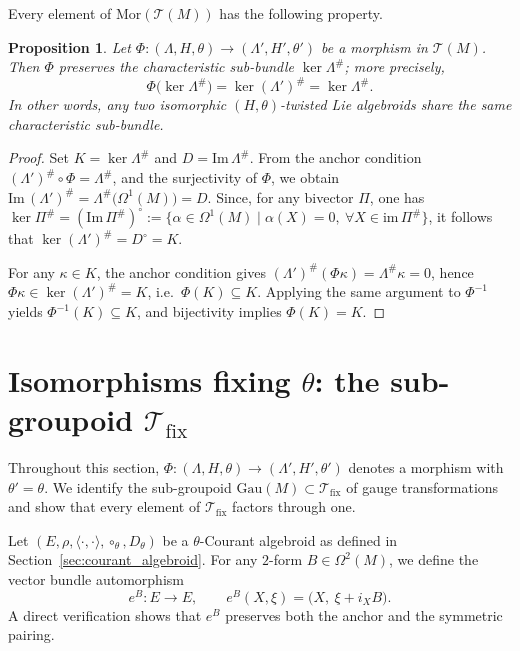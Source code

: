 \documentclass[11pt,a4paper]{article}
\theoremstyle{plain}
\newtheorem{proposition}[theorem]{Proposition}
\theoremstyle{definition}
\theoremstyle{remark}
\begin{document}
Every element of $\mathrm{Mor}(\mathcal{T}(M))$ has the following property.
\begin{proposition}\label{preservation_ancre}
	Let $\Phi : (\Lambda,H,\theta) \to (\Lambda',H',\theta')$ be a morphism
	in $\mathcal{T}(M)$. Then $\Phi$ preserves the characteristic sub-bundle
	$\ker\Lambda^\#$; more precisely,
	$$
	\Phi\bigl(\ker\Lambda^\#\bigr) = \ker(\Lambda')^\# = \ker\Lambda^\#.
	$$
	In other words, any two isomorphic $(H,\theta)$-twisted Lie algebroids
	share the same characteristic sub-bundle.
\end{proposition}

\begin{proof}
	Set $K = \ker\Lambda^\#$ and $D = \mathrm{Im}\,\Lambda^\#$.
	From the anchor condition $(\Lambda')^\#\circ\Phi = \Lambda^\#$, and the
	surjectivity of $\Phi$, we obtain
	$\mathrm{Im}\,(\Lambda')^\# = \Lambda^\#\bigl(\Omega^1(M)\bigr) = D$.
	Since, for any bivector $\Pi$, one has
	$\ker\Pi^\# = (\mathrm{Im}\,\Pi^\#)^\circ
	:= \{\alpha\in\Omega^1(M)\mid \alpha(X)=0,\ \forall X\in \mathrm{im}\,\Pi^\#\}$,
	it follows that
	$\ker(\Lambda')^\# = D^\circ = K$.
	
	For any $\kappa \in K$, the anchor condition gives
	$(\Lambda')^\#(\Phi\kappa) = \Lambda^\#\kappa = 0$, hence
	$\Phi\kappa \in \ker(\Lambda')^\# = K$, i.e.\ $\Phi(K)\subseteq K$.
	Applying the same argument to $\Phi^{-1}$ yields $\Phi^{-1}(K)\subseteq K$,
	and bijectivity implies $\Phi(K)=K$.
\end{proof}

\section{Isomorphisms fixing $\theta$: the sub-groupoid $\mathcal{T}_{\mathrm{fix}}$}
\label{sec:tfix}
 Throughout this section, $\Phi : (\Lambda,H,\theta) \to (\Lambda',H',\theta')$ denotes a morphism with $\theta'=\theta$. We identify the sub-groupoid $\mathrm{Gau}(M)\subset\mathcal{T}_{\mathrm{fix}}$ of gauge transformations and show that every element of $\mathcal{T}_{\mathrm{fix}}$ factors through one.


Let $(E,\rho,\langle\cdot,\cdot\rangle,\circ_\theta,D_\theta)$ be a $\theta$-Courant algebroid as defined in
Section~\ref{sec:courant_algebroid}.
For any $2$-form $B\in\Omega^2(M)$, we define the vector bundle automorphism
\begin{equation*}
	e^{B}\colon E\longrightarrow E,\qquad
	e^{B}(X,\xi) = \bigl(X,\ \xi + i_X B\bigr).
\end{equation*}
A direct verification shows that $e^{B}$ preserves both the anchor and the symmetric pairing.
\end{document}
